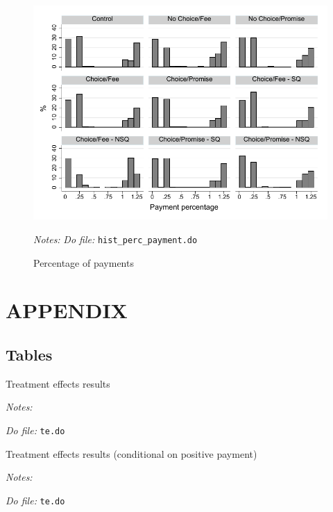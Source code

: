 \documentclass[11pt]{article}
\begin{document}
\begin{figure}[H]
        \caption{Percentage of payments}
    \label{HistPayments}
    \begin{center}
        \centering
        \includegraphics[width=\textwidth]{Figuras/hist_perc_payment.pdf}
    \end{center}
     \footnotesize \textit{Notes: } 
      \footnotesize{ \textit{Do file: }  \texttt{hist\_perc\_payment.do}}
\end{figure}

\pagebreak




\section{APPENDIX}

\subsection{Tables}

\begin{landscape}
\begin{table}[H]
\caption{Treatment effects results}
\label{te_table}
\begin{center}
\scriptsize{}
\end{center}
 \footnotesize
\textit{Notes:} 

\textit{Do file: } \texttt{te.do}
\end{table}


\begin{table}[H]
\caption{Treatment effects results (conditional on positive payment)}
\label{te_robust_table}
\begin{center}
\scriptsize{}
\end{center}
 \footnotesize
\textit{Notes:} 

\textit{Do file: } \texttt{te.do}
\end{table}

\end{landscape}
\end{document}
